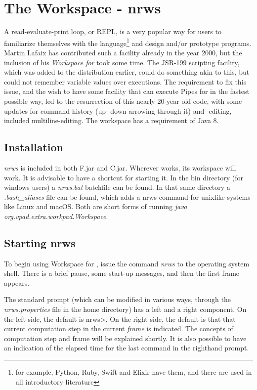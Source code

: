 \chapter{The \nr{} Workspace - nrws}
A read-evaluate-print  loop, or REPL, is a very popular way for users to familiarize themselves with the language\footnote{for example, Python, Ruby, Swift and Elixir have them, and there are used in all introductory literature} and design and/or prototype programs. Martin Lafaix has contributed such a facility already in the year 2000, but the inclusion of his \emph{Workspace for \nr{}} took some time. The JSR-199 scripting facility, which was added to the distribution earlier, could do something akin to this, but could not remember variable values over executions. The requirement to fix this issue, and the wish to have some facility that can execute Pipes for \nr{} in the fastest possible way, led to the resurrection of this nearly 20-year old code, with some updates for command history (up- down arrowing through it) and -editing, included multiline-editing. The \nr{} workspace has a requirement of Java 8.

 \section{Installation}
 \emph{nrws} is included in both \nr{}F.jar and \nr{}C.jar. Wherever \nr{} works, its workspace will work.
 It is advisable to have a shortcut for starting it. In the bin directory (for windows users) a \emph{nrws.bat} batchfile can be found. In that same directory a \emph{.bash\_aliases} file can be found, which adds a nrws command for unixlike systems like Linux and macOS. Both are short forms of running \emph{java org.vpad.extra.workpad.Workspace}.

\section{Starting nrws}

To begin using Workspace for \nr{}, issue the command \emph{nrws} to the operating system shell. There is a brief pause, some start-up messages, and then the first frame appears.

The standard prompt (which can be modified in various ways, through the \emph{nrws.properties} file in the home directory) has a left and a right component. On the left side, the default is nrws>. On the right side, the default is that that current computation step in the current \emph{frame} is indicated. The concepts of computation step and frame will be explained shortly. It is also possible to have an indication of the elapsed time for the last command in the righthand prompt.

